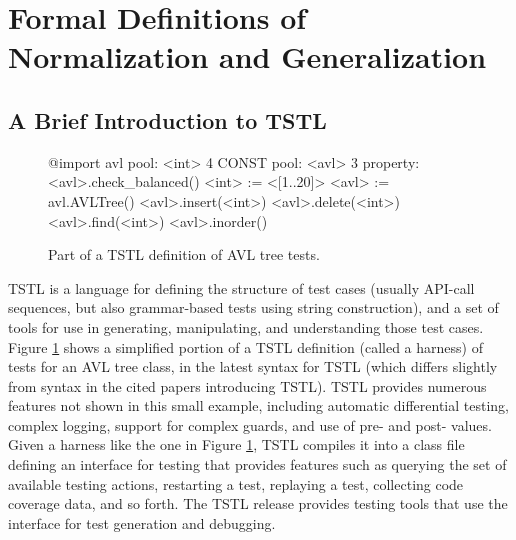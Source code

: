 \section{Formal Definitions of Normalization and Generalization}

\subsection{A Brief Introduction to TSTL}

\begin{figure}
{\scriptsize
\begin{code}
@import avl
\vspace{0.05in}
pool: <int> 4 CONST
pool: <avl> 3
\vspace{0.05in}
property: <avl>.check\_balanced()
\vspace{0.05in}
<int> := <[1..20]>
<avl> := avl.AVLTree()
\vspace{0.05in}
<avl>.insert(<int>)
<avl>.delete(<int>)
<avl>.find(<int>)
<avl>.inorder()
\end{code}
}
\caption{Part of a TSTL definition of AVL tree tests.}
\label{fig:example}
\end{figure}


TSTL \cite{NFM15,ISSTA15} is a language for defining the structure of
test cases (usually API-call sequences, but also grammar-based tests using
string construction), and a set of tools for use in generating,
manipulating, and understanding those test cases.  Figure
\ref{fig:example} shows a simplified portion of a TSTL definition
(called a harness) of
tests for an AVL tree class, in the latest syntax for TSTL (which
differs slightly from syntax in the cited papers introducing TSTL).
TSTL provides numerous features not shown in this small example,
including automatic differential testing, complex logging, support for
complex guards, and use of pre- and post- values.  Given a harness
like the one in Figure \ref{fig:example}, TSTL compiles it into a
class file defining an interface for testing that provides features
such as querying the set of available testing actions, restarting a
test, replaying a test, collecting code coverage data, and so forth.
The TSTL release \cite{tstl} provides testing tools that use the
interface for test generation and debugging.

